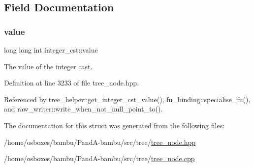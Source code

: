 \subsection{Field Documentation}
\mbox{\label{structinteger__cst_ab58ecb061cc1565a9293ee216acd28d4}} 
\subsubsection{\texorpdfstring{value}{value}}
{\footnotesize\ttfamily long long int integer\+\_\+cst\+::value}



The value of the integer cast. 



Definition at line 3233 of file tree\+\_\+node.\+hpp.



Referenced by tree\+\_\+helper\+::get\+\_\+integer\+\_\+cst\+\_\+value(), fu\+\_\+binding\+::specialise\+\_\+fu(), and raw\+\_\+writer\+::write\+\_\+when\+\_\+not\+\_\+null\+\_\+point\+\_\+to().



The documentation for this struct was generated from the following files\+:\begin{DoxyCompactItemize}
\item 
/home/osboxes/bambu/\+Pand\+A-\/bambu/src/tree/\hyperlink{tree__node_8hpp}{tree\+\_\+node.\+hpp}\item 
/home/osboxes/bambu/\+Pand\+A-\/bambu/src/tree/\hyperlink{tree__node_8cpp}{tree\+\_\+node.\+cpp}\end{DoxyCompactItemize}
